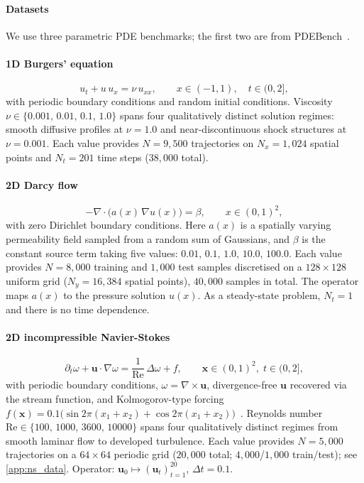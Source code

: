 \documentclass[preprint,10pt]{elsarticle}
\begin{document}
\paragraph{Datasets}
We use three parametric PDE benchmarks; the first two are from PDEBench~\cite{Takamoto2022}.

\paragraph{1D Burgers' equation}
\begin{equation}
  u_t + u\,u_x = \nu\,u_{xx},
  \qquad x\in(-1,1),\quad t\in(0,2],
  \label{eq:burgers}
\end{equation}
with periodic boundary conditions and random initial conditions.
Viscosity $\nu\in\{0.001,\,0.01,\,0.1,\,1.0\}$ spans four qualitatively
distinct solution regimes: smooth diffusive profiles at $\nu{=}1.0$ and
near-discontinuous shock structures at $\nu{=}0.001$.
Each value provides $N{=}9{,}500$ trajectories on $N_x{=}1{,}024$
spatial points and $N_t{=}201$ time steps ($38{,}000$ total).

\paragraph{2D Darcy flow}
\begin{equation}
  -\nabla\cdot\bigl(a(x)\,\nabla u(x)\bigr) = \beta,
  \qquad x\in(0,1)^2,
  \label{eq:darcy}
\end{equation}
with zero Dirichlet boundary conditions.
Here $a(x)$ is a spatially varying permeability field sampled from a
random sum of Gaussians, and $\beta$ is the constant source term taking
five values: $0.01,\,0.1,\,1.0,\,10.0,\,100.0$.
Each value provides $N{=}8{,}000$ training and $1{,}000$ test samples
discretised on a $128{\times}128$ uniform grid ($N_y{=}16{,}384$ spatial points),
$40{,}000$ samples in total.
The operator maps $a(x)$ to the pressure solution $u(x)$.
As a steady-state problem, $N_t{=}1$ and there is no time dependence.

\paragraph{2D incompressible Navier-Stokes}
\begin{equation}
  \partial_t \omega + \mathbf{u}\cdot\nabla\omega
  = \frac{1}{\mathrm{Re}}\,\Delta\omega + f,
  \qquad \mathbf{x}\in(0,1)^2,\; t\in(0,2],
  \label{eq:ns}
\end{equation}
with periodic boundary conditions, $\omega=\nabla\times\mathbf{u}$,
divergence-free $\mathbf{u}$ recovered via the stream function,
and Kolmogorov-type forcing
$f(\mathbf{x})=0.1\bigl(\sin 2\pi(x_1{+}x_2)+\cos 2\pi(x_1{+}x_2)\bigr)$~\citep{Li2021}.
Reynolds number $\mathrm{Re}\in\{100,\,1000,\,3600,\,10000\}$ spans four
qualitatively distinct regimes from smooth laminar flow to developed turbulence.
Each value provides $N{=}5{,}000$ trajectories on a $64{\times}64$ periodic
grid ($20{,}000$ total; $4{,}000$/$1{,}000$ train/test);
see \ref{app:ns_data}.
Operator: $\mathbf{u}_0\mapsto(\mathbf{u}_t)_{t=1}^{20}$, $\Delta t{=}0.1$.
\end{document}
